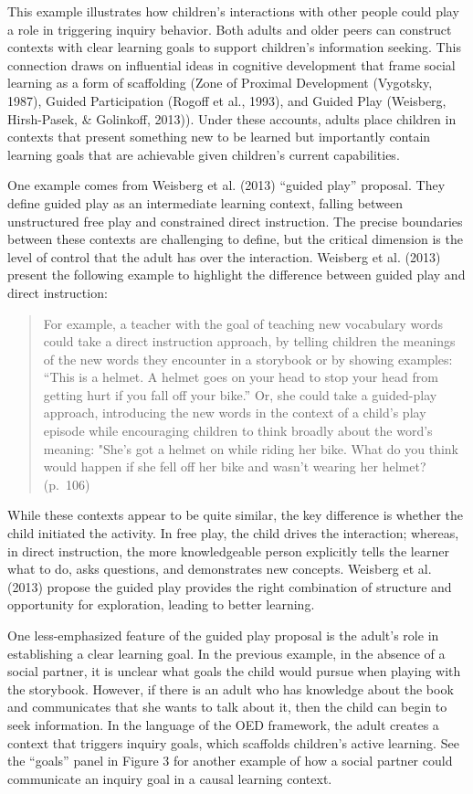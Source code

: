 \documentclass[oneside]{report}
\begin{document}
This example illustrates how children's interactions with other people
could play a role in triggering inquiry behavior. Both adults and older
peers can construct contexts with clear learning goals to support
children's information seeking. This connection draws on influential
ideas in cognitive development that frame social learning as a form of
scaffolding (Zone of Proximal Development (Vygotsky, 1987), Guided
Participation (Rogoff et al., 1993), and Guided Play (Weisberg,
Hirsh-Pasek, \& Golinkoff, 2013)). Under these accounts, adults place
children in contexts that present something new to be learned but
importantly contain learning goals that are achievable given children's
current capabilities.

One example comes from Weisberg et al. (2013) ``guided play'' proposal.
They define guided play as an intermediate learning context, falling
between unstructured free play and constrained direct instruction. The
precise boundaries between these contexts are challenging to define, but
the critical dimension is the level of control that the adult has over
the interaction. Weisberg et al. (2013) present the following example to
highlight the difference between guided play and direct instruction:
\begin{quote}
For example, a teacher with the goal of teaching new vocabulary words
could take a direct instruction approach, by telling children the
meanings of the new words they encounter in a storybook or by showing
examples: ``This is a helmet. A helmet goes on your head to stop your
head from getting hurt if you fall off your bike.'' Or, she could take a
guided-play approach, introducing the new words in the context of a
child's play episode while encouraging children to think broadly about
the word's meaning: "She's got a helmet on while riding her bike. What
do you think would happen if she fell off her bike and wasn't wearing
her helmet? (p.~106)
\end{quote}
\noindent While these contexts appear to be quite similar, the key
difference is whether the child initiated the activity. In free play,
the child drives the interaction; whereas, in direct instruction, the
more knowledgeable person explicitly tells the learner what to do, asks
questions, and demonstrates new concepts. Weisberg et al. (2013) propose
the guided play provides the right combination of structure and
opportunity for exploration, leading to better learning.

One less-emphasized feature of the guided play proposal is the adult's
role in establishing a clear learning goal. In the previous example, in
the absence of a social partner, it is unclear what goals the child
would pursue when playing with the storybook. However, if there is an
adult who has knowledge about the book and communicates that she wants
to talk about it, then the child can begin to seek information. In the
language of the OED framework, the adult creates a context that triggers
inquiry goals, which scaffolds children's active learning. See the
``goals'' panel in Figure 3 for another example of how a social partner
could communicate an inquiry goal in a causal learning context.
\end{document}
